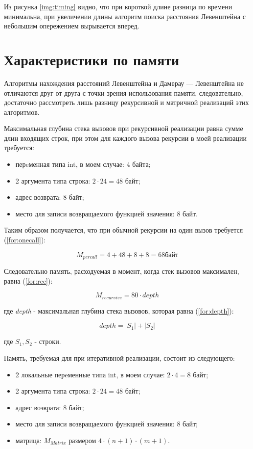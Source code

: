    
Из рисунка \ref{img:timing} видно, что при короткой длине разница по времени минимальна, при увеличении длины алгоритм поиска расстояния Левенштейна с небольшим опережением вырывается вперед.




\section{Характеристики по памяти}

Алгоритмы нахождения расстояний Левенштейна и Дамерау — Левенштейна не отличаются друг от друга с точки зрения использования памяти, следовательно, достаточно рассмотреть лишь разницу рекурсивной и матричной реализаций этих алгоритмов.

Максимальная глубина стека вызовов при рекурсивной реализации равна сумме длин входящих строк, при этом для каждого вызова рекурсии в моей реализации требуется:
\begin{itemize}
    \item перeменная типа int, в моем случае: $4 $ байта;
    \item 2 аргумента типа строка: $2 \cdot 24 = 48$ байт;
    \item адрес возврата: 8 байт;
    \item место для записи возвращаемого функцией значения: 8 байт.
\end{itemize}
Таким образом получается, что при обычной рекурсии на один вызов требуется (\ref{for:onecall}): 

\begin{equation}
M_{per call} = 4 + 48 + 8 + 8 = 68 байт
\label{for:onecall}
\end{equation}

Следовательно память, расходуемая в момент, когда стек вызовов максимален, равна (\ref{for:rec}): 

\begin{equation}
    M_{recursive} = 80 \cdot depth
\label{for:rec}
\end{equation}

где \textit{depth} - максимальная глубина стека вызовов, которая равна (\ref{for:depth}):

\begin{equation}
depth = |S_1| + |S_2|
\label{for:depth}
\end{equation}

где $S_1, S_2$ - строки.


Память, требуемая для при итеративной реализации, состоит из следующего:
\begin{itemize}
    \item 2 локальные перeменные типа int, в моем случае: $2 \cdot 4 = 8$ байт;
    \item 2 аргумента типа строка: $2 \cdot 24 = 48$ байт;
    \item адрес возврата: 8 байт;
    \item место для записи возвращаемого функцией значения: 8 байт;
    \item матрица: $M_{Matrix}$ размером $4 \cdot (n + 1) \cdot (m + 1)$.
\end{itemize}

